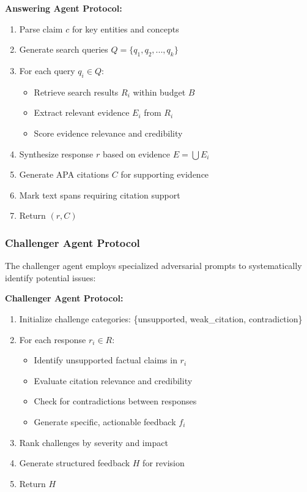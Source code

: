 \documentclass[11pt,a4paper]{article}
\begin{document}
\textbf{Answering Agent Protocol:}
\begin{enumerate}
\item Parse claim $c$ for key entities and concepts
\item Generate search queries $Q = \{q_1, q_2, ..., q_k\}$
\item For each query $q_i \in Q$:
    \begin{itemize}
    \item Retrieve search results $R_i$ within budget $B$
    \item Extract relevant evidence $E_i$ from $R_i$
    \item Score evidence relevance and credibility
    \end{itemize}
\item Synthesize response $r$ based on evidence $E = \bigcup E_i$
\item Generate APA citations $C$ for supporting evidence
\item Mark text spans requiring citation support
\item Return $(r, C)$
\end{enumerate}

\subsubsection{Challenger Agent Protocol}

The challenger agent employs specialized adversarial prompts to systematically identify potential issues:

\textbf{Challenger Agent Protocol:}
\begin{enumerate}
\item Initialize challenge categories: \{unsupported, weak\_citation, contradiction\}
\item For each response $r_i \in R$:
    \begin{itemize}
    \item Identify unsupported factual claims in $r_i$
    \item Evaluate citation relevance and credibility
    \item Check for contradictions between responses
    \item Generate specific, actionable feedback $f_i$
    \end{itemize}
\item Rank challenges by severity and impact
\item Generate structured feedback $H$ for revision
\item Return $H$
\end{enumerate}
\end{document}
